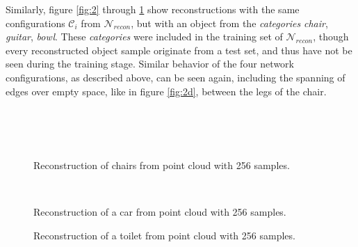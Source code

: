   Similarly, figure \ref{fig:2} through \ref{fig:5} show reconstructions with the same configurations $\mathcal{C}_i$ from $\mathcal{N}_{recon}$,
  but with an object from the \emph{categories} \emph{chair}, \emph{guitar}, \emph{bowl}. These \emph{categories} were included
  in the training set of $\mathcal{N}_{recon}$, though every reconstructed object sample originate from a test set, and thus have not be seen
  during the training stage.
  Similar behavior of the four network configurations, as described above, can be seen again, including the spanning of edges over empty space,
  like in figure \ref{fig:2d}, between the legs of the chair.


\begin{figure}[htbp]
  \centering
  \centering
  \\
  \\
  \\
  \caption{Reconstruction of chairs from point cloud with 256 samples.} \label{fig:5}
\end{figure}
\begin{figure}[htbp]
  \centering
  \\
  \caption{Reconstruction of a car from point cloud with 256 samples.} \label{fig:51}
\end{figure}
\begin{figure}[htbp]
  \centering
  \caption{Reconstruction of a toilet from point cloud with 256 samples.} \label{fig:52}
\end{figure}
